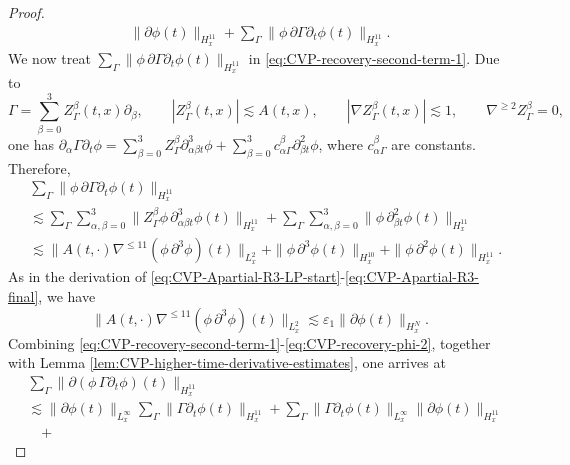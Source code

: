 \documentclass[11pt,twoside]{article}
\def\ds{\displaystyle}
\def\p{\partial}
\def\ve{\varepsilon}
\def\ls{\lesssim}
\theoremstyle{plain}
\theoremstyle{definition}
\theoremstyle{assumption}
\numberwithin{equation}{section}
\begin{document}
\begin{proof}
\begin{equation}
\begin{aligned}
				\|\p\phi(t)\|_{H^{11}_x}
				+\sum_{\Gamma}
				\|\phi\,\p\Gamma\p_t\phi(t)\|_{H^{11}_x}.
			\end{aligned}
		\end{equation}
		We now treat $\ds\sum_{\Gamma}
		\|\phi\,\p\Gamma\p_t\phi(t)\|_{H^{11}_x}$ in \eqref{eq:CVP-recovery-second-term-1}. Due to
		\[
		\Gamma
		=
		\sum_{\beta=0}^3 Z^\beta_\Gamma(t,x)\p_\beta,
		\qquad
		|Z^\beta_\Gamma(t,x)|\ls A(t,x),
		\qquad
		|\nabla Z^\beta_\Gamma(t,x)|\ls1,
		\qquad
		\nabla^{\ge2}Z^\beta_\Gamma=0,
		\]
		one has
		$\p_\alpha\Gamma\p_t\phi
		=\ds\sum_{\beta=0}^3Z^\beta_\Gamma
		\p_{\alpha\beta t}^3\phi
		+\ds\sum_{\beta=0}^3
		c_{\alpha\Gamma}^{\beta}
		\p_{\beta t}^2\phi$,
		where \(c_{\alpha\Gamma}^{\beta}\) are constants. Therefore,
		\begin{equation}
			\label{eq:CVP-recovery-phi-pGamma-ptphi}
			\begin{aligned}
				&\sum_{\Gamma}
				\|\phi\,\p\Gamma\p_t\phi(t)\|_{H^{11}_x}\\
				&\ls
				\sum_{\Gamma}
				\sum_{\alpha,\beta=0}^3
				\|Z^\beta_\Gamma\phi\,\p_{\alpha\beta t}^3\phi(t)\|_{H^{11}_x}
				+\sum_{\Gamma}
				\sum_{\alpha,\beta=0}^3
				\|\phi\,\p_{\beta t}^2\phi(t)\|_{H^{11}_x}\\
				&\ls
				\|A(t,\cdot)\nabla^{\le 11}(\phi\,\p^3\phi)(t)\|_{L^{2}_x}
				+\|\phi\,\p^3\phi(t)\|_{H^{10}_x}
				+\|\phi\,\p^2\phi(t)\|_{H^{11}_x}.
			\end{aligned}
		\end{equation}
		As in the derivation of
		\eqref{eq:CVP-Apartial-R3-LP-start}-\eqref{eq:CVP-Apartial-R3-final}, we have
		\begin{equation}
			\label{eq:CVP-recovery-phi-2}
			\|A(t,\cdot)\nabla^{\le 11}(\phi\,\p^3\phi)(t)\|_{L^{2}_x}
			\ls
			\ve_1
			\|\p\phi(t)\|_{H^N_x}.
		\end{equation}
		Combining \eqref{eq:CVP-recovery-second-term-1}-\eqref{eq:CVP-recovery-phi-2}, together with Lemma \ref{lem:CVP-higher-time-derivative-estimates}, one arrives at
		\begin{equation}
			\label{eq:CVP-recovery-second-term}
			\begin{aligned}
				&
				\sum_{\Gamma}
				\|\p(\phi\,\Gamma\p_t\phi)(t)\|_{H^{11}_x}
				\\
				&\ls
				\|\p\phi(t)\|_{L^\infty_x}
				\sum_{\Gamma}
				\|\Gamma\p_t\phi(t)\|_{H^{11}_x}
				+
				\sum_{\Gamma}
				\|\Gamma\p_t\phi(t)\|_{L^\infty_x}
				\|\p\phi(t)\|_{H^{11}_x}
				\\
				&\quad+

\end{aligned}
\end{equation}
\end{proof}
\end{document}
